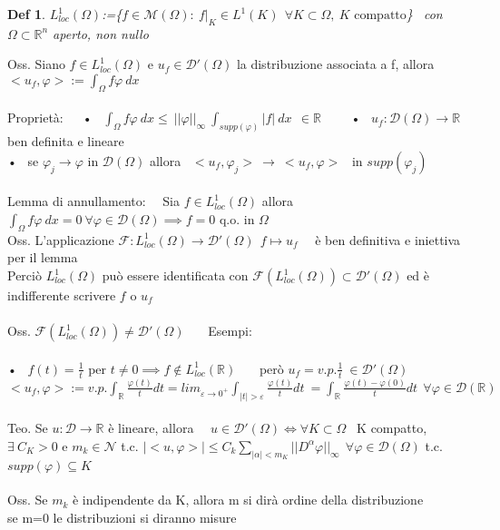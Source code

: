 \documentclass{article}
\theoremstyle{unnumbered}
\newtheorem* {theoremT}{Def}
\theoremstyle{unnumbered1}
\newenvironment{defi}{\begin{gBox}\begin{theoremT}}{\end{theoremT}\end{gBox}}
\newcommand{\eps}{\varepsilon}
\renewcommand{\phi}{\varphi}
\begin{document}
\begin{defi}
$L^1_{loc}(\Omega)$:=\{$f\in \mathcal{M}(\Omega) : \ f|_K\in L^1(K) \ \ \forall K\subset\Omega, \ K \text{ compatto}$\} \ con $\Omega\subset\mathbb{R}^n$ aperto, non nullo
\end{defi}
%
Oss. Siano $f\in L^1_{loc}(\Omega)$ e $u_f\in\mathcal{D}'(\Omega)$ la distribuzione associata a f, allora \ $<u_f,\phi>:=\int_{\Omega}f\phi \ dx$\\ \\
%
%
Proprietà:\ \
\ • \ $\int_{\Omega} f\phi \ dx \le \ ||\phi||_{\infty} \ \int_{supp(\phi)}|f| \ dx \ \ \in \mathbb{R}$ \ \ \
\ • \ $u_f : \mathcal{D}(\Omega)\to\mathbb{R}$ ben definita e lineare\\
\hspace*{0.7in} • \ se $\phi_j\to\phi$ in $\mathcal{D}(\Omega)$ allora \  $<u_f,\phi_j> \ \to \ <u_f,\phi> $ \  in $supp(\phi_j)$\\ \\
%
%
Lemma di annullamento: \ \ Sia $f\in L^1_{loc}(\Omega) $ allora $ \int_{\Omega}f\phi \ dx = 0 \ \forall\phi\in\mathcal{D}(\Omega) \implies f=0$ q.o. in $\Omega$\\
Oss. L'applicazione $\mathcal{F}:L^1_{loc}(\Omega)\to \mathcal{D}'(\Omega) \ \ f \mapsto u_f$ \ \ è ben definitiva e iniettiva per il lemma\\
Perciò $L^1_{loc}(\Omega)$ può essere identificata con  $\mathcal{F}(L^1_{loc}(\Omega))\subset\mathcal{D}'(\Omega)$ ed è indifferente scrivere $f$ o $u_f$\\ \\
%
%
Oss. $\mathcal{F}(L^1_{loc}(\Omega))\ne\mathcal{D}'(\Omega)$ \ \ \ Esempi:\\ \\
%
• \ $f(t)=\frac1t$ per $t\neq 0 \implies f\not\in L^1_{loc}(\mathbb{R})$ \ \ \ però $u_f=v.p.\frac1t \ \in \mathcal{D}'(\Omega)$ \\
\phantom{• \ }$<u_f,\phi>:= v.p. \int_{\mathbb{R}}\frac{\phi(t)}{t}dt = lim_{\eps\to 0^+} \int_{|t|>\eps}\frac{\phi(t)}{t}dt \ =\int_{\mathbb{R}}\frac{\phi(t)-\phi(0)}{t} dt \ \ \forall \phi\in\mathcal{D}(\mathbb{R})$\\ \\
%
%
Teo. Se $u:\mathcal{D}\to\mathbb{R}$ è lineare, allora \ \  $u\in\mathcal{D}'(\Omega)\Leftrightarrow \forall K\subset\Omega$ \ K compatto, $\exists \ C_K>0$ e $m_k\in\mathcal{N}$ t.c. $|<u,\phi>|\le C_k \sum_{|\alpha|<m_K} ||D^{\alpha}\phi||_{\infty} \ \ \forall\phi\in\mathcal{D}(\Omega)$ t.c. $supp(\phi)\subseteq K$\\ \\
%
Oss. Se $m_k$ è indipendente da K, allora m si dirà ordine della distribuzione \\
se m=0 le distribuzioni si diranno misure\\
\end{document}
